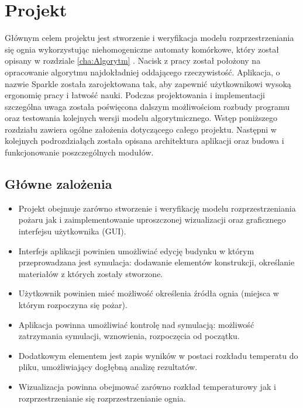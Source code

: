 \chapter {Projekt}
Głównym celem projektu jest stworzenie i weryfikacja modelu rozprzestrzeniania się ognia wykorzystując niehomogeniczne automaty
komórkowe, który został opisany w rozdziale \ref{cha:Algorytm} . Nacisk z pracy został położony na opracowanie algorytmu najdokładniej oddającego rzeczywistość.
Aplikacja, o nazwie Sparkle została zarojektowana tak, aby zapewnić użytkownikowi wysoką ergonomię pracy i łatwość nauki.
Podczas projektowania i implementacji szczególna uwaga została poświęcona dalszym możliwościom rozbudy programu oraz testowania 
kolejnych wersji modelu algorytmicznego. Wstęp poniższego rozdziału zawiera ogólne założenia dotyczącego całego projektu. 
Następni w kolejnych podrozdziałąch została opisana architektura aplikacji oraz budowa i funkcjonowanie poszczególnych modułów.
\label{cha:projekt}
\section {Główne zalożenia}
\begin {itemize}
\item Projekt obejmuje zarówno stworzenie i weryfikację modelu rozprzestrzeniania pożaru jak i zaimplementowanie uproszczonej wizualizacji oraz graficznego interfejsu użytkownika (GUI).
\item Interfejs aplikacji powinien umożliwiać edycję budynku w którym przeprowadzana jest symulacja: dodawanie elementów konstrukcji, 
określanie materiałów z których zostały stworzone. 
\item Użytkownik powinien mieć możliwość określenia źródła ognia (miejsca w którym rozpoczyna się pożar).
\item Aplikacja powinna umożliwiać kontrolę nad symulacją: możliwość zatrzymania symulacji, wznowienia, rozpoczęcia od początku.
\item Dodatkowym elementem jest zapis wyników w postaci rozkładu temperatu do pliku, umożliwiający dogłębną analizę rezultatów.
\item Wizualizacja powinna obejmować zarówno rozkład temperaturowy jak i rozprzestrzenianie się rozprzestrzenianie ognia. 
\end {itemize}
